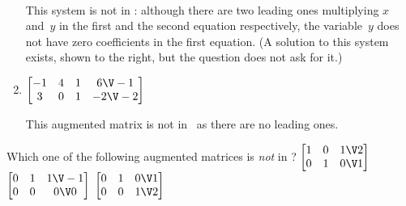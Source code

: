 \begin{example}
\begin{enumerate}[ref=\ref{eg:rref}(\alph*)]
\begin{solution} \ \\
\begin{figbox}{}%
This system is not in \rref: 
although there are two leading ones multiplying \(x\) and~\(y\) in the first and the second equation respectively, the variable~\(y\) does not have zero coefficients in the first equation.  
(A solution to this system exists, shown to the right, but the question does not ask for it.)
\aqed
\end{figbox}
\end{solution}


\item \(\begin{bmatrix} -1&4&1&6\V-1
\\3&0&1&-2\V-2
 \end{bmatrix}\)
\begin{solution} 
This augmented matrix is not in \rref\ as there are no leading ones. 
\end{solution}
\end{enumerate}
\end{example}


\begin{activity}
Which one of the following augmented matrices is \emph{not} in ?
{\(\begin{bmatrix} 1&0&1\V2
\\0&1&0\V1 \end{bmatrix}\)}
{\(\begin{bmatrix} 0&1&1\V-1
\\0&0&0\V0 \end{bmatrix}\)}
{\(\begin{bmatrix} 0&1&0\V1
\\0&0&1\V2 \end{bmatrix}\)}
\end{activity}





